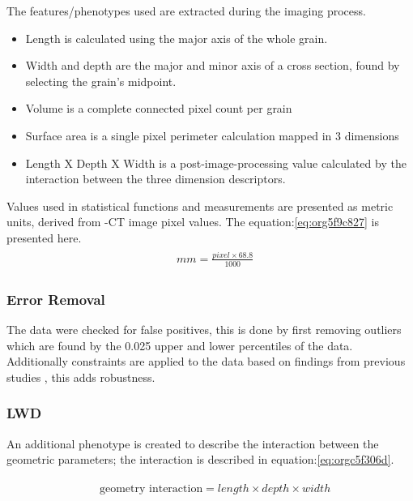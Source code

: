 \documentclass[a4paper]{article}
\begin{document}
The features/phenotypes used are extracted during the imaging process.

\begin{itemize}
\item Length is calculated using the major axis of the whole grain.
\item Width and depth are the major and minor axis of a cross section, found by selecting the grain's midpoint.
\item Volume is a complete connected pixel count per grain
\item Surface area is a single pixel perimeter calculation mapped in 3 dimensions
\item Length X Depth X Width is a post-image-processing value calculated by the interaction between the three dimension descriptors.
\end{itemize}

Values used in statistical functions and measurements are presented as metric units, derived from \textmu{}-CT image pixel values. The equation:\ref{eq:org5f9c827} is presented here.
\begin{align}
\label{eq:org5f9c827}
  &\begin{aligned}
mm = \frac{pixel \times 68.8}{1000}
  \end{aligned}
\end{align}

\subsubsection{Error Removal}
\label{sec:org0d50ab6}
The data were checked for false positives, this is done by first removing outliers which are found by the 0.025 upper and lower percentiles of the data. Additionally constraints are applied to the data based on findings from previous studies \cite{Hughes2017}, this adds robustness.

\subsubsection{LWD}
\label{sec:orga500c80}
An additional phenotype is created to describe the interaction between the geometric parameters; the interaction is described in equation:\ref{eq:orgc5f306d}.

 \begin{align}
\label{eq:orgc5f306d}
   &\begin{aligned}
\text{geometry interaction} = length \times depth \times width
   \end{aligned}
 \end{align}
\end{document}
